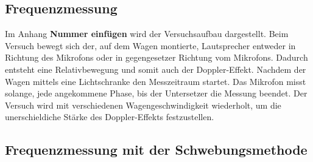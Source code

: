 \documentclass[parskip=half]{scrartcl} %
\begin{document}
\subsection{Frequenzmessung}

Im Anhang \textbf{Nummer einfügen} wird der Versuchsaufbau dargestellt.
Beim Versuch bewegt sich der, auf dem Wagen montierte, Lautsprecher entweder 
in Richtung des Mikrofons oder in gegengesetzer Richtung vom Mikrofons.
Dadurch entsteht eine Relativbewegung und somit auch der
Doppler-Effekt.
Nachdem der Wagen mittels eine Lichtschranke den Messzeitraum startet.
Das Mikrofon misst solange, jede angekommene Phase, bis der Untersetzer 
die Messung beendet.
Der Versuch wird mit verschiedenen Wagengeschwindigkeit
wiederholt, um die unerschieldiche Stärke des Doppler-Effekts 
festzustellen.

\subsection{Frequenzmessung mit der Schwebungsmethode}

\printbibliography
\printindex
\end{document}
